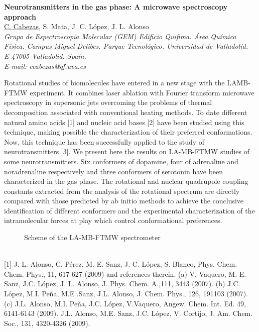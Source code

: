 \newpage
\setcounter{figure}{0}
\begin{center}
{\bf \Large
Neurotransmitters in the gas phase: A microwave spectroscopy approach
}
\\
\vspace{0.5cm}
\underline{C. Cabezas}, S. Mata, J. C. López, J. L. Alonso
\\
\vspace{0.5cm}
{\it 
Grupo de Espectroscopía Molecular (GEM) Edificio Quifima. Área Química Física.
Campus Miguel Delibes. Parque Tecnológico. Universidad de Valladolid. E-47005 Valladolid. Spain.
}
\\
\vspace{0.5cm}
{\it E-mail: ccabezas@qf.uva.es}
\\
\vspace{0.5cm}
\end{center}
Rotational studies of biomolecules have entered in a new stage with the LAMB-FTMW experiment.
It combines laser ablation with Fourier transform
microwave spectroscopy in supersonic jets overcoming the problems of thermal
decomposition associated with conventional heating methods. To date different
natural amino acids [1] and nucleic acid bases [2] have been studied using this
technique, making possible the characterization of their preferred conformations.
Now, this technique has been successfully applied to the study of neurotransmitters
[3]. We present here the results on LA-MB-FTMW studies of some
neurotransmitters. Six conformers of dopamine, four of adrenaline and noradrenaline
respectively and three conformers of serotonin have been characterized in the gas
phase. The rotational and nuclear quadrupole coupling constants extracted from the
analysis of the rotational spectrum are directly compared with those predicted by ab
initio methods to achieve the conclusive identification of different conformers and
the experimental characterization of the intramolecular forces at play which control
conformational preferences.
\\
\begin{figure}[h]
 \centerline{}
 \caption[]{Scheme of the LA-MB-FTMW spectrometer}\label{figure 1}
\end{figure}
\\
{\footnotesize
[1] J. L. Alonso, C. Pérez, M. E. Sanz, J. C. López, S. Blanco, Phys. Chem. Chem. Phys., 11, 617-627 (2009) and references therein.
\newline
[2] (a) V. Vaquero, M. E. Sanz, J.C. López, J. L. Alonso, J. Phys. Chem. A.,111, 3443 (2007). (b) J.C.  López, M.I. Peña, M.E .Sanz, J.L. Alonso, J. Chem. Phys., 126, 191103 (2007). (c) J.L. Alonso, M.I.  Peña, J.C. López, V.Vaquero, Angew. Chem. Int. Ed. 49, 6141-6143 (2009).
\newline
[3] J.L. Alonso, M.E. Sanz, J.C. López, V. Cortijo, J. Am. Chem. Soc., 131, 4320-4326 (2009).
}

